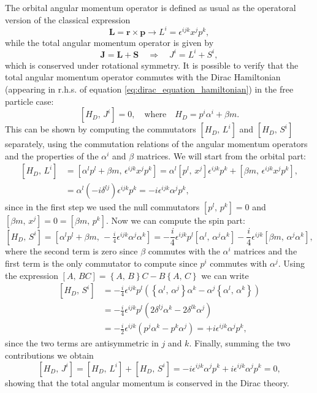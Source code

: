 The orbital angular momentum operator is defined as usual as the operatoral version of the classical expression
\[
    \mathbf{L} = \mathbf{r}\times \mathbf{p} \longrightarrow L^i = \epsilon^{ijk} x^j p^k,
\]
while the total angular momentum operator is given by
\[
    \mathbf{J} = \mathbf{L} + \mathbf{S} \quad \Longrightarrow \quad J^i = L^i + S^i,
\]
which is conserved under rotational symmetry. It is possible to verify that the total angular momentum operator commutes with the Dirac Hamiltonian (appearing in r.h.s. of equation \eqref{eq:dirac_equation_hamiltonian}) in the free particle case:
\[
    \left[H_D,\, J^i\right] = 0, \quad \text{where} \quad H_D = p^i \alpha^i + \beta m.
\]
This can be shown by computing the commutators \(\left[H_D,\, L^i\right]\) and \(\left[H_D,\, S^i\right]\) separately, using the commutation relations of the angular momentum operators and the properties of the \(\alpha^i\) and \(\beta\) matrices. We will start from the orbital part:
\[
    \begin{aligned}
        \left[H_D,\, L^i\right] & = \left[\alpha^l p^l + \beta m,\, \epsilon^{ijk} x^j p^k\right] = \alpha^l \left[p^l,\, x^j \right] \epsilon^{ijk} p^k + \left[\beta m,\, \epsilon^{ijk} x^j p^k\right], \\
                                & = \alpha^l \left(-i \delta^{lj}\right) \epsilon^{ijk} p^k = -i \epsilon^{ijk} \alpha^j p^k,
    \end{aligned}
\]
since in the first step we used the null commutators \(\left[p^l,\, p^k\right] = 0\) and \(\left[\beta m,\, x^j\right] = 0 = \left[\beta m,\, p^k\right]\). Now we can compute the spin part:
\[
    \left[H_D,\, S^i\right] = \left[\alpha^l p^l + \beta m,\, -\tfrac{i}{4} \epsilon^{ijk} \alpha^j \alpha^k\right] = - \frac{i}{4} \epsilon^{ijk} p^l \left[\alpha^l,\, \alpha^j \alpha^k\right] - \frac{i}{4} \epsilon^{ijk} \left[\beta m,\, \alpha^j \alpha^k\right],
\]
where the second term is zero since \(\beta\) commutes with the \(\alpha^i\) matrices and the first term is the only commutator to compute since \(p^i\) commutes with \(\alpha^j\). Using the expression \(\left[A,\,BC\right] = \left\{A,\,B\right\}C - B\left\{A,\,C\right\}\) we can write
\[
    \begin{aligned}
        \left[H_D,\, S^i\right] & = - \frac{i}{4} \epsilon^{ijk} p^l \left( \left\{\alpha^l,\,\alpha^j\right\}\alpha^k - \alpha^j \left\{\alpha^l,\, \alpha^k\right\} \right) \\
                                & = - \frac{i}{4} \epsilon^{ijk} p^l \left( 2 \delta^{lj} \alpha^k - 2 \delta^{lk} \alpha^j \right)                                           \\
                                & = - \frac{i}{2} \epsilon^{ijk} \left(p^j \alpha^k - p^k \alpha^j\right) = + i \epsilon^{ijk} \alpha^j p^k,
    \end{aligned}
\]
since the two terms are antisymmetric in \(j\) and \(k\). Finally, summing the two contributions we obtain
\[
    \left[H_D,\, J^i\right] = \left[H_D,\, L^i\right] + \left[H_D,\, S^i\right] = -i \epsilon^{ijk} \alpha^j p^k + i \epsilon^{ijk} \alpha^j p^k = 0,
\]
showing that the total angular momentum is conserved in the Dirac theory.

